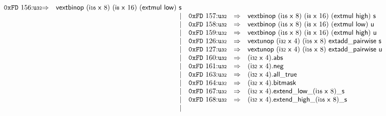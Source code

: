$$\begin{array}{@{}l@{}rrlll@{}l@{}}
\mathtt{0xFD}~156{:}{\mathtt{u{\scriptstyle32}}} &\Rightarrow& \mathsf{vextbinop}~(\mathsf{i{\scriptstyle16}}~\mathsf{x}~8)~(\mathsf{i{\scriptstyle8}}~\mathsf{x}~16)~(\mathsf{extmul}~\mathsf{low})~\mathsf{s} \\ &&|&
\mathtt{0xFD}~157{:}{\mathtt{u{\scriptstyle32}}} &\Rightarrow& \mathsf{vextbinop}~(\mathsf{i{\scriptstyle16}}~\mathsf{x}~8)~(\mathsf{i{\scriptstyle8}}~\mathsf{x}~16)~(\mathsf{extmul}~\mathsf{high})~\mathsf{s} \\ &&|&
\mathtt{0xFD}~158{:}{\mathtt{u{\scriptstyle32}}} &\Rightarrow& \mathsf{vextbinop}~(\mathsf{i{\scriptstyle16}}~\mathsf{x}~8)~(\mathsf{i{\scriptstyle8}}~\mathsf{x}~16)~(\mathsf{extmul}~\mathsf{low})~\mathsf{u} \\ &&|&
\mathtt{0xFD}~159{:}{\mathtt{u{\scriptstyle32}}} &\Rightarrow& \mathsf{vextbinop}~(\mathsf{i{\scriptstyle16}}~\mathsf{x}~8)~(\mathsf{i{\scriptstyle8}}~\mathsf{x}~16)~(\mathsf{extmul}~\mathsf{high})~\mathsf{u} \\ &&|&
\mathtt{0xFD}~126{:}{\mathtt{u{\scriptstyle32}}} &\Rightarrow& \mathsf{vextunop}~(\mathsf{i{\scriptstyle32}}~\mathsf{x}~4)~(\mathsf{i{\scriptstyle16}}~\mathsf{x}~8)~\mathsf{extadd\_pairwise}~\mathsf{s} \\ &&|&
\mathtt{0xFD}~127{:}{\mathtt{u{\scriptstyle32}}} &\Rightarrow& \mathsf{vextunop}~(\mathsf{i{\scriptstyle32}}~\mathsf{x}~4)~(\mathsf{i{\scriptstyle16}}~\mathsf{x}~8)~\mathsf{extadd\_pairwise}~\mathsf{u} \\ &&|&
\mathtt{0xFD}~160{:}{\mathtt{u{\scriptstyle32}}} &\Rightarrow& (\mathsf{i{\scriptstyle32}}~\mathsf{x}~4) . \mathsf{abs} \\ &&|&
\mathtt{0xFD}~161{:}{\mathtt{u{\scriptstyle32}}} &\Rightarrow& (\mathsf{i{\scriptstyle32}}~\mathsf{x}~4) . \mathsf{neg} \\ &&|&
\mathtt{0xFD}~163{:}{\mathtt{u{\scriptstyle32}}} &\Rightarrow& (\mathsf{i{\scriptstyle32}}~\mathsf{x}~4) . \mathsf{all\_true} \\ &&|&
\mathtt{0xFD}~164{:}{\mathtt{u{\scriptstyle32}}} &\Rightarrow& (\mathsf{i{\scriptstyle32}}~\mathsf{x}~4).\mathsf{bitmask} \\ &&|&
\mathtt{0xFD}~167{:}{\mathtt{u{\scriptstyle32}}} &\Rightarrow& (\mathsf{i{\scriptstyle32}}~\mathsf{x}~4) . {{{{{{\mathsf{extend}}{\mathsf{\_}}}{\mathsf{low}}}{\mathsf{\_}}}{(\mathsf{i{\scriptstyle16}}~\mathsf{x}~8)}}{\mathsf{\_}}}{\mathsf{s}} \\ &&|&
\mathtt{0xFD}~168{:}{\mathtt{u{\scriptstyle32}}} &\Rightarrow& (\mathsf{i{\scriptstyle32}}~\mathsf{x}~4) . {{{{{{\mathsf{extend}}{\mathsf{\_}}}{\mathsf{high}}}{\mathsf{\_}}}{(\mathsf{i{\scriptstyle16}}~\mathsf{x}~8)}}{\mathsf{\_}}}{\mathsf{s}} \\ &&|&

\end{array}$$
